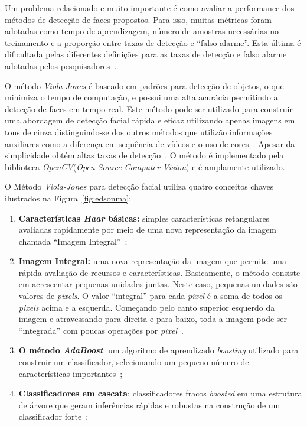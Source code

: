 	Um problema relacionado e muito importante é como avaliar a performance dos
	métodos de detecção de faces propostos. Para isso, muitas métricas foram
	adotadas como tempo de aprendizagem, número de amostras necessárias no
	treinamento e a proporção entre taxas de detecção e ``falso alarme''. Esta
	última é dificultada pelas diferentes definições para as taxas de detecção e
	falso alarme adotadas pelos pesquisadores~\cite{yang}.
	
	O método \textit{Viola-Jones} é baseado em padrões para detecção de objetos, o
	que minimiza o tempo de computação, e possui uma alta acurácia permitindo a
	detecção de faces em tempo real. Este método pode ser utilizado para construir
	uma abordagem de detecção facial rápida e eficaz utilizando apenas imagens em
	tons de cinza distinguindo-se dos outros métodos que utilizão informações
	auxiliares como a diferença em sequência de vídeos e o uso de
	cores~\cite{edsonma, violajones}. Apesar da simplicidade obtém altas taxas de
	detecção~\cite{edsonma}. O método é implementado pela biblioteca
	\textit{OpenCV}(\textit{Open Source Computer Vision}) e é amplamente utilizado.
	
	O Método \textit{Viola-Jones} para detecção facial utiliza quatro conceitos
	chaves ilustrados na Figura~\ref{fig:edsonma}:
		
	\begin{enumerate}
		\item \textbf{Características \textit{Haar} básicas:} simples características
		retangulares avaliadas rapidamente por meio de uma nova representação da imagem
		chamada ``Imagem Integral''~\cite{servodetection,violajones,edsonma};
		
		\item \textbf{Imagem Integral:} uma nova representação da imagem que permite uma
		rápida avaliação de recursos e características. Basicamente, o método consiste
		em acrescentar pequenas unidades juntas. Neste caso, pequenas unidades são
		valores de \textit{pixels}. O valor ``integral'' para cada \textit{pixel} é a
		soma de todos os \textit{pixels} acima e a esquerda. Começando pelo canto
		superior esquerdo da imagem e atravessando para direita e para baixo, toda a
		imagem pode ser ``integrada'' com poucas operações por
		\textit{pixel}~\cite{servodetection, violajones}.
		
		\item \textbf{O método \textit{AdaBoost}}: um algoritmo de aprendizado
		\textit{boosting} utilizado para construir um classificador, selecionando um
		pequeno número de características importantes~\cite{servodetection,violajones,
		edsonma};
		
		\item \textbf{Classificadores em cascata}: classificadores fracos
		\textit{boosted} em uma estrutura de árvore que geram inferências rápidas e
		robustas na construção de um classificador
		forte~\cite{servodetection,violajones,edsonma};
	\end{enumerate}


